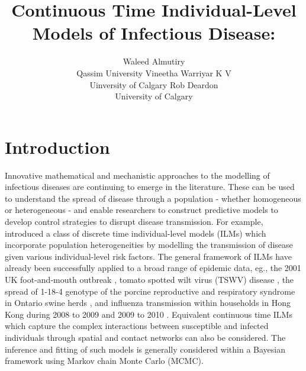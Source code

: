 \documentclass[nojss,shortnames]{jss}
\author{Waleed Almutiry\\Qassim University \And
Vineetha Warriyar K V\\ Uinversity of Calgary \And 
        Rob Deardon\\University of Calgary }
\title{Continuous Time Individual-Level Models of Infectious Disease: \pkg{EpiILMCT}}
\begin{document}
\section[Introduction]{Introduction}


Innovative mathematical and mechanistic approaches to the modelling of infectious diseases are continuing to emerge in the literature. These can be used to understand the spread of disease through a population - whether homogeneous or heterogeneous - and enable researchers to construct predictive models to develop control strategies to disrupt disease transmission. For example, \citet{deardon2010inference} introduced a class of discrete time individual-level models (ILMs) which incorporate population heterogeneities by modelling the transmission of disease given various individual-level risk factors. The general framework of ILMs have already been successfully applied to a broad range of epidemic data, eg., the 2001 UK foot-and-mouth outbreak \citep{deardon2010inference,deeth2016spatial,malik2016parameterizing}, tomato spotted wilt virus (TSWV) disease \citep{pokharel2014supervised,pokharel2016gaussian}, the spread of 1-18-4 genotype of the porcine reproductive and respiratory syndrome in Ontario swine herds \citep{kwong2013bayesian}, and influenza transmission within households in Hong Kong during 2008 to 2009 and 2009 to 2010 \citep{malik2014individual}. Equivalent continuous time ILMs which capture the complex interactions between susceptible and infected individuals through spatial and contact networks can also be considered. The inference and fitting of such models is generally considered within a Bayesian framework using Markov chain Monte Carlo (MCMC). 
\end{document}
